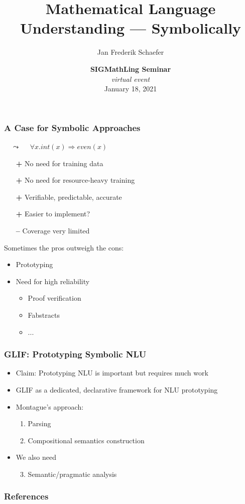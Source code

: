 \documentclass[aspectratio=169]{beamer}
\title{Mathematical Language Understanding --- Symbolically}
\author{Jan Frederik Schaefer}
\institute{FAU Erlangen-N\"urnberg}
\date{\textbf{SIGMathLing Seminar} \\ \textit{virtual event} \\ January 18, 2021 }
\begin{document}
\frame\titlepage

\begin{frame}
    \frametitle{A Case for Symbolic Approaches}
    {
        \centering
         $\quad\leadsto\quad$ {\color{logicfg}$\forall x.int(x) \Rightarrow even(x)$}\par
    }

    \vspace{1.5em}
    \begin{itemize}
        \item[\textbf{+}] No need for training data
        \item[\textbf{+}] No need for resource-heavy training
        \item[\textbf{+}] Verifiable, predictable, accurate
        \item[\textbf{+}] Easier to implement?
        \item[\textbf{--\hspace{0.15em}}] Coverage very limited
    \end{itemize}

    \vspace{1.5em}
    Sometimes the pros outweigh the cons:
    \begin{itemize}
        \item Prototyping
        \item Need for high reliability
            \begin{itemize}
                \item Proof verification
                \item Fabstracts
                \item ...
            \end{itemize}
    \end{itemize}
\end{frame}

\begin{frame}
    \frametitle{GLIF: Prototyping Symbolic NLU}
    \begin{itemize}
        \item Claim: Prototyping NLU is important but requires much work
        \item GLIF as a dedicated, declarative framework for NLU prototyping
        \item Montague's approach:
            \begin{enumerate}
                \item Parsing
                \item Compositional semantics construction
            \end{enumerate}
        \item We also need
            \begin{enumerate}
                \setcounter{enumi}{2}
                \item Semantic/pragmatic analysis
            \end{enumerate}
    \end{itemize}
\end{frame}



\appendix

\begin{frame}[allowframebreaks,t]
    \frametitle{References}
    \printbibliography
\end{frame}
\end{document}
